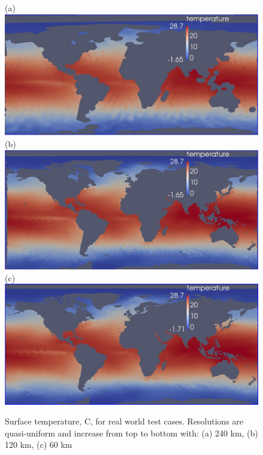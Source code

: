 \begin{figure}[H!]
	\centering
(a)\includegraphics[scale=0.36]{ocean/figures/m72m_240km_yr11_k1_T.jpg}\\
(b)\includegraphics[scale=0.36]{ocean/figures/m72g_120km_yr11_k1_T.jpg}\\
(c)\includegraphics[scale=0.36]{ocean/figures/m72h_60km_yr11_k1_T.jpg}
\caption{Surface temperature, C, for real world test cases.  Resolutions are quasi-uniform and increase from top to bottom with: (a) 240 km, (b) 120 km, (c) 60 km} 
	\label{fig:real_world_T1}
\end{figure}

